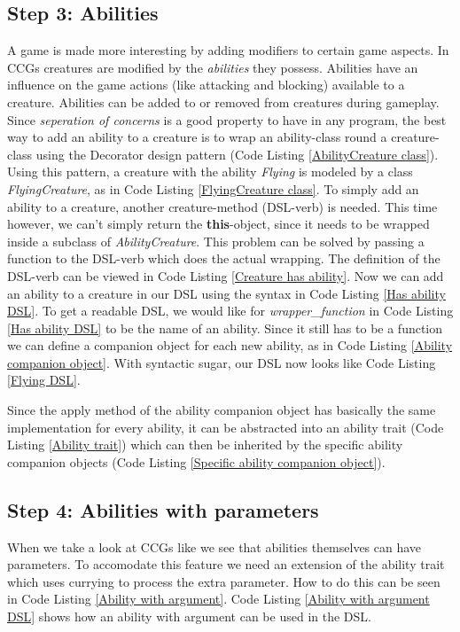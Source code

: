 \subsection*{Step 3: Abilities}
A game is made more interesting by adding modifiers to certain game aspects. In CCGs creatures are modified by the \textit{abilities} they possess. Abilities have an influence on the game actions (like attacking and blocking) available to a creature. Abilities can be added to or removed from creatures during gameplay. Since \textit{seperation of concerns} is a good property to have in any program, the best way to add an ability to a creature is to wrap an ability-class round a creature-class using the {Decorator} design pattern (Code Listing \ref{AbilityCreature class}). Using this pattern, a creature with the ability \textit{Flying} is modeled by a class \textit{FlyingCreature}, as in Code Listing \ref{FlyingCreature class}.
To simply add an ability to a creature, another creature-method (DSL-verb) is needed. This time however, we can't simply return the \textbf{this}-object, since it needs to be wrapped inside a subclass of \textit{AbilityCreature}. This problem can be solved by passing a function to the DSL-verb which does the actual wrapping. The definition of the DSL-verb can be viewed in Code Listing \ref{Creature has ability}. Now we can add an ability to a creature in our DSL using the syntax in Code Listing \ref{Has ability DSL}. To get a readable DSL, we would like for \textit{wrapper\_function} in Code Listing \ref{Has ability DSL} to be the name of an ability. Since it still has to be a function we can define a companion object for each new ability, as in Code Listing \ref{Ability companion object}. With syntactic sugar, our DSL now looks like Code Listing \ref{Flying DSL}.

Since the apply method of the ability companion object has basically the same implementation for every ability, it can be abstracted into an ability trait (Code Listing \ref{Ability trait}) which can then be inherited by the specific ability companion objects (Code Listing \ref{Specific ability companion object}).

\subsection*{Step 4: Abilities with parameters}
When we take a look at CCGs like \cite{magic-the-gathering} we see that abilities themselves can have parameters. To accomodate this feature we need an extension of the ability trait which uses currying to process the extra parameter. How to do this can be seen in Code Listing \ref{Ability with argument}. Code Listing \ref{Ability with argument DSL} shows how an ability with argument can be used in the DSL.
